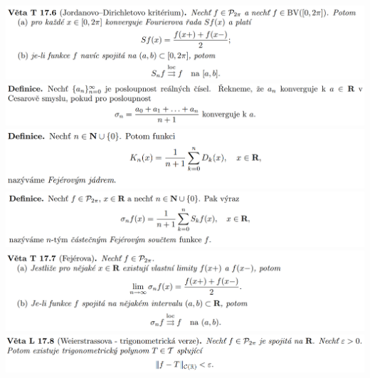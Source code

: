 \documentclass[12pt,a4paper]{article}
\begin{document}
\begin{center}
		\includegraphics[width=\textwidth]{img/4four/2020-06-21 11 47 48.png}\vspace{0.3cm}
		\includegraphics[width=\textwidth]{img/4four/2020-06-21 11 49 05.png}\vspace{0.3cm}
		\includegraphics[width=\textwidth]{img/4four/2020-06-21 11 49 12.png}\vspace{0.3cm}
		\includegraphics[width=\textwidth]{img/4four/2020-06-21 11 49 28.png}\vspace{0.3cm}
		\includegraphics[width=\textwidth]{img/4four/2020-06-21 11 49 36.png}\vspace{0.3cm}
		\includegraphics[width=\textwidth]{img/4four/2020-06-21 13 21 23.png}\vspace{0.3cm}
	\end{center}
	
\end{document}
